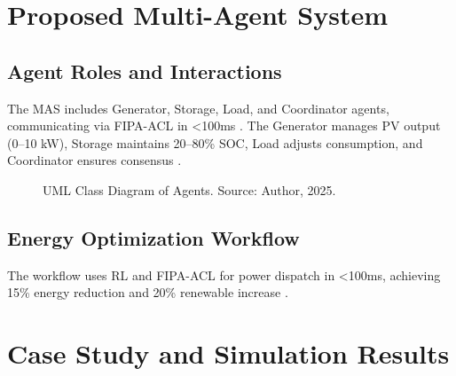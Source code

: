 \documentclass[12pt]{report}
\begin{document}
\clearpage
\chapter{Proposed Multi-Agent System}
\label{chap:proposed_mas}
\section{Agent Roles and Interactions}
The MAS includes Generator, Storage, Load, and Coordinator agents, communicating via FIPA-ACL in <100ms \cite{fipa2020}. The Generator manages PV output (0--10 kW), Storage maintains 20--80\% SOC, Load adjusts consumption, and Coordinator ensures consensus \cite{author2025}.

\begin{figure}[h]
  \centering
  \caption{UML Class Diagram of Agents. Source: Author, 2025.}
  \label{fig:uml_agents}
\end{figure}

\section{Energy Optimization Workflow}
The workflow uses RL and FIPA-ACL for power dispatch in <100ms, achieving 15\% energy reduction and 20\% renewable increase \cite{author2025}.

\begin{table}[h]
  \centering
  \caption{Energy Optimization Workflow}
  \label{tab:workflow}
\end{table}

\clearpage
\chapter{Case Study and Simulation Results}
\label{chap:results}
\end{document}

